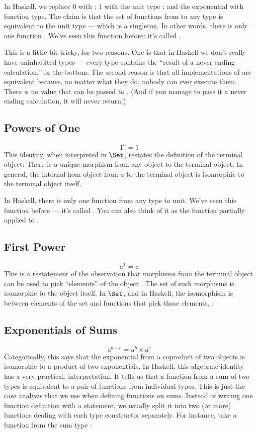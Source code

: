 In Haskell, we replace 0 with ; 1 with the unit type
\code{()}; and the exponential with function type. The claim is that
the set of functions from  to any type  is
equivalent to the unit type --- which is a singleton. In other words,
there is only one function . We've seen
this function before: it's called .

This is a little bit tricky, for two reasons. One is that in Haskell we
don't really have uninhabited types --- every type contains the ``result
of a never ending calculation,'' or the bottom. The second reason is
that all implementations of  are equivalent because, no
matter what they do, nobody can ever execute them. There is no value
that can be passed to . (And if you manage to pass it a
never ending calculation, it will never return!)

\subsection{Powers of One}

\[1^{a} = 1\]
This identity, when interpreted in $\Set$, restates the definition
of the terminal object: There is a unique morphism from any object to
the terminal object. In general, the internal hom-object from $a$
to the terminal object is isomorphic to the terminal object itself.

In Haskell, there is only one function from any type  to unit.
We've seen this function before --- it's called . You can
also think of it as the function  partially applied to
\code{()}.

\subsection{First Power}

\[a^{1} = a\]
This is a restatement of the observation that morphisms from the
terminal object can be used to pick ``elements'' of the object
. The set of such morphisms is isomorphic to the object
itself. In $\Set$, and in Haskell, the isomorphism is between
elements of the set  and functions that pick those elements,
.

\subsection{Exponentials of Sums}

\[a^{b+c} = a^{b} \times a^{c}\]
Categorically, this says that the exponential from a coproduct of two
objects is isomorphic to a product of two exponentials. In Haskell, this
algebraic identity has a very practical, interpretation. It tells us
that a function from a sum of two types is equivalent to a pair of
functions from individual types. This is just the case analysis that we
use when defining functions on sums. Instead of writing one function
definition with a  statement, we usually split it into two
(or more) functions dealing with each type constructor separately. For
instance, take a function from the sum type
:

